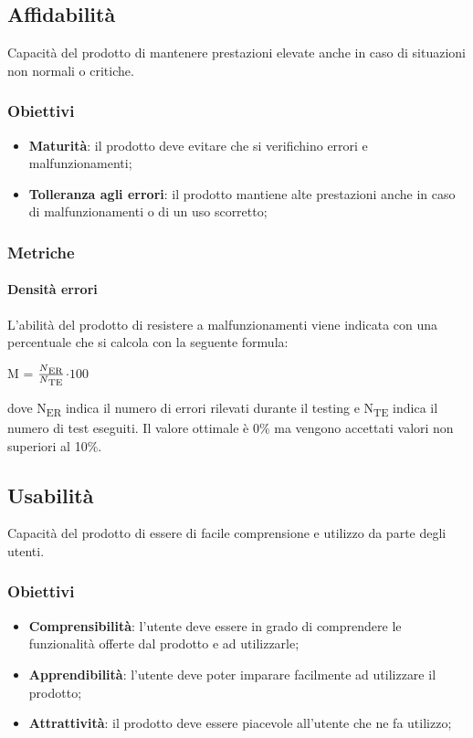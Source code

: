 	\subsection{Affidabilità}
	Capacità del prodotto di mantenere prestazioni elevate anche in caso di situazioni non normali o critiche.
		\subsubsection{Obiettivi}
		\begin{itemize}
			\item \textbf{Maturità}: il prodotto deve evitare che si verifichino errori e malfunzionamenti;
			\item \textbf{Tolleranza agli errori}: il prodotto mantiene alte prestazioni anche in caso di malfunzionamenti o di un uso scorretto;
		\end{itemize}
		\subsubsection{Metriche}
			\paragraph{Densità errori}
			L'abilità del prodotto di resistere a malfunzionamenti viene indicata con una percentuale che si calcola con la seguente formula: \\
			\centerline{ M =  \(\frac{N\textsubscript{ER}}{N\textsubscript{TE}} \)$ \cdot 100$ }
			dove N\textsubscript{ER} indica il numero di errori rilevati durante il testing e N\textsubscript{TE} indica il numero di test eseguiti. Il valore ottimale è 0\% ma vengono accettati valori non superiori al 10\%.
	\subsection{Usabilità}
	Capacità del prodotto di essere di facile comprensione e utilizzo da parte degli utenti.
		\subsubsection{Obiettivi}
		\begin{itemize}
			\item \textbf{Comprensibilità}: l'utente deve essere in grado di comprendere le funzionalità offerte dal prodotto e ad utilizzarle;
			\item \textbf{Apprendibilità}: l'utente deve poter imparare facilmente ad utilizzare il prodotto;
			\item \textbf{Attrattività}: il prodotto deve essere piacevole all'utente che ne fa utilizzo;
		\end{itemize}
